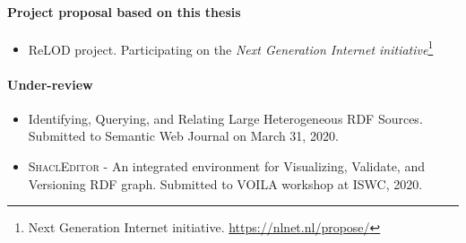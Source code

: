 \paragraph{Project proposal based on this thesis}
\begin{itemize}
    \item ReLOD project. Participating on the \textit{Next Generation Internet initiative}\footnote{Next Generation Internet initiative. \url{https://nlnet.nl/propose/}}
\end{itemize}

\paragraph{Under-review}

\begin{itemize}
    \item Identifying, Querying, and Relating Large Heterogeneous RDF Sources. Submitted to Semantic Web Journal on March 31, 2020\cite{valdestilhasSWJ2020}.
    \item \textsc{ShaclEditor} - An integrated environment for Visualizing, Validate, and Versioning RDF graph. Submitted to VOILA workshop at ISWC, 2020\cite{valdestilhasISWC2020}.
\end{itemize}